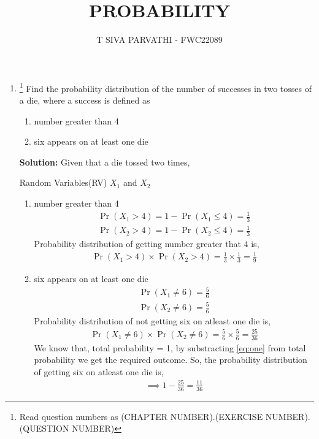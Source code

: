 \documentclass{article}
\providecommand{\pr}[1]{\ensuremath{\Pr\left(#1\right)}}
\newcommand{\solution}{\noindent \textbf{Solution: }}
\begin{document}
\title{PROBABILITY}
\author{\Large T SIVA PARVATHI - FWC22089}
\date{}

\maketitle
\begin{enumerate}[label=13.\arabic{enumi}.\arabic{enumii}]%
\setcounter{enumi}{3}
\setcounter{enumii}{5}

\item \footnote{Read question numbers as (CHAPTER NUMBER).(EXERCISE NUMBER).(QUESTION NUMBER)}
Find the probability distribution of the number of successes in two tosses of a die, where a success is defined as
\begin{enumerate}
\item number greater than 4
\item six appears on at least one die
\end{enumerate}

\solution
Given that a die tossed two times,
\begin{table}[h]\centering
	
	 \caption{Random Variables(RV) $X_1$ and $X_2$}\label{table:1}
\end{table}

\begin{enumerate}
\item number greater than 4
\begin{align}
\pr{X_1>4}=1-\pr{X_1\le4}=\frac{1}{3}\\
\pr{X_2>4}=1-\pr{X_2\le4}=\frac{1}{3}
\end{align}
Probability distribution of getting number greater that 4 is,
\begin{align}
\pr{X_1>4} \times \pr{X_2>4} = \frac{1}{3} \times \frac{1}{3}=\frac{1}{9}
\end{align}
\item six appears on at least one die
\begin{align}
\pr{X_1\neq6}=\frac{5}{6}\\
\pr{X_2\neq6}=\frac{5}{6}
\end{align}
Probability distribution of not getting six on atleast one die is, 
\begin{align}
\label{eq:one}
\pr{X_1\neq6} \times \pr{X_2\neq6} = \frac{5}{6} \times \frac{5}{6}=\frac{25}{36}
\end{align}
We know that, total probability = 1,
by substracting \eqref{eq:one} from total probability we get the required outcome. 
So, the probability distribution of getting six on atleast one die is,
\begin{align}
\implies 1-\frac{25}{36} = \frac{11}{36}
\end{align}
\end{enumerate}
\end{enumerate}
\end{document}
